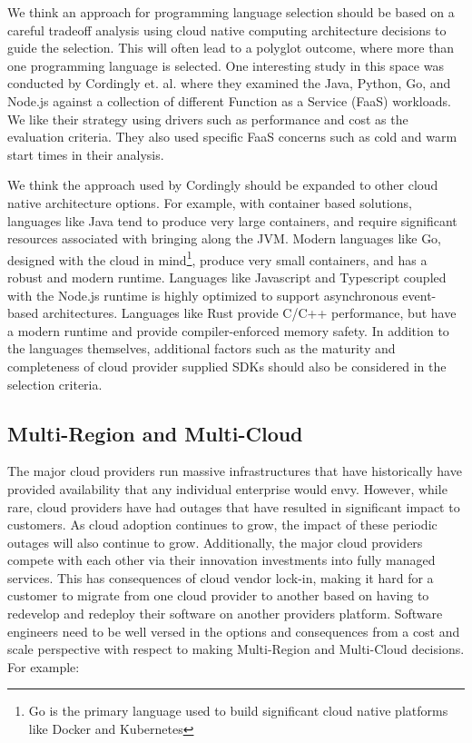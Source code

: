 \documentclass[conference]{IEEEtran}
\begin{document}
We think an approach for programming language selection should be based on a careful tradeoff analysis using cloud native computing architecture decisions to guide the selection.  This will often lead to a polyglot outcome, where more than one programming language is selected.  One interesting study in this space was conducted by Cordingly et. al.\cite{Serverless} where they examined the Java, Python, Go, and Node.js against a collection of different Function as a Service (FaaS) workloads.  We like their strategy using drivers such as performance and cost as the evaluation criteria.  They also used specific FaaS concerns such as cold and warm start times in their analysis. 

We think the approach used by Cordingly should be expanded to other cloud native architecture options.  For example, with container based solutions, languages like Java tend to produce very large containers, and require significant resources associated with bringing along the JVM.  Modern languages like Go, designed with the cloud in mind\footnote{Go is the primary language used to build significant cloud native platforms like Docker and Kubernetes}, produce very small containers, and has a robust and modern runtime.  Languages like Javascript and Typescript coupled with the Node.js runtime is highly optimized to support asynchronous event-based architectures. Languages like Rust provide C/C++ performance, but have a modern runtime and provide compiler-enforced memory safety. In addition to the languages themselves, additional factors such as the maturity and completeness of cloud provider supplied SDKs should also be considered in the selection criteria. 

\subsection{Multi-Region and Multi-Cloud}
The major cloud providers run massive infrastructures that have historically have provided availability that any individual enterprise would envy. However, while rare, cloud providers have had outages that have resulted in significant impact to customers. As cloud adoption continues to grow, the impact of these periodic outages will also continue to grow.  Additionally, the major cloud providers compete with each other via their innovation investments into fully managed services.  This has consequences of cloud vendor lock-in, making it hard for a customer to migrate from one cloud provider to another based on having to redevelop and redeploy their software on another providers platform.  Software engineers need to be well versed in the options and consequences from a cost and scale perspective with respect to making Multi-Region and Multi-Cloud decisions. For example: 
\end{document}
